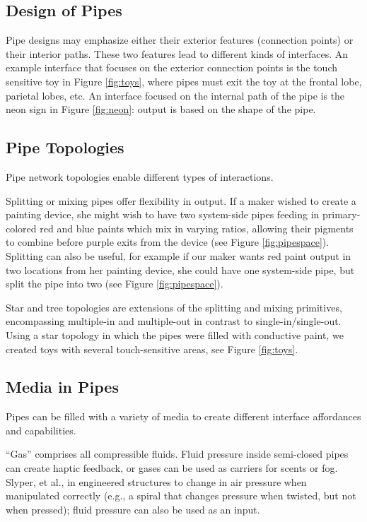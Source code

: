 \subsection{Design of Pipes}
Pipe designs may emphasize either their exterior features (connection points) or their interior paths.  These two features lead to different kinds of interfaces.  An example interface that focuses on the exterior connection points is the touch sensitive toy in Figure \ref{fig:toys}, where pipes must exit the toy at the frontal lobe, parietal lobes, etc.  An interface focused on the internal path of the pipe is the neon sign in Figure \ref{fig:neon}: output is based on the shape of the pipe.

\subsection{Pipe Topologies}

Pipe network topologies enable different types of interactions.

Splitting or mixing pipes offer flexibility in output.  If a maker wished to create a painting device, she might wish to have two system-side pipes feeding in primary-colored red and blue paints which mix in varying ratios, allowing their pigments to combine before purple exits from the device (see Figure \ref{fig:pipespace}).  Splitting can also be useful, for example if our maker wants red paint output in two locations from her painting device, she could have one system-side pipe, but split the pipe into two (see Figure \ref{fig:pipespace}).

Star and tree topologies are extensions of the splitting and mixing primitives, encompassing multiple-in and multiple-out in contrast to single-in/single-out.  Using a star topology in which the pipes were filled with conductive paint, we created toys with several touch-sensitive areas, see Figure \ref{fig:toys}. 

\subsection{Media in Pipes}

Pipes can be filled with a variety of media to create different interface affordances and capabilities.

``Gas'' comprises all compressible fluids.  Fluid pressure inside semi-closed pipes can create haptic feedback, or gases can be used as carriers for scents or fog.  Slyper, et al.,  in \cite{Slyper-pressure} engineered structures to change in air pressure when manipulated correctly (e.g., a spiral that changes pressure when twisted, but not when pressed); fluid pressure can also be used as an input.

